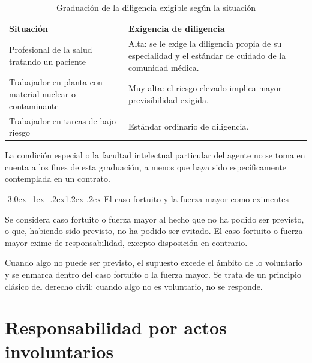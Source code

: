 \documentclass[12pt,oneside]{book}
\makeatletter
\renewcommand\section{\@startsection{section}{1}{\z@}%
  {-3.0ex \@plus -1ex \@minus -.2ex}{1.2ex \@plus .2ex}%
  {\normalfont\large\bfseries\color{acento}}}
\makeatother
\begin{document}
\begin{table}[H]
\centering
\caption{Graduación de la diligencia exigible según la situación}
\begin{tabularx}{\textwidth}{X X}
\toprule
\textbf{Situación} & \textbf{Exigencia de diligencia} \\
\midrule
Profesional de la salud tratando un paciente & Alta: se le exige la diligencia propia de su especialidad y el estándar de cuidado de la comunidad médica. \\
Trabajador en planta con material nuclear o contaminante & Muy alta: el riesgo elevado implica mayor previsibilidad exigida. \\
Trabajador en tareas de bajo riesgo & Estándar ordinario de diligencia. \\
\bottomrule
\end{tabularx}
\end{table}

La condición especial o la facultad intelectual particular del agente no se toma en cuenta a los fines de esta graduación, a menos que haya sido específicamente contemplada en un contrato.

\section{El caso fortuito y la fuerza mayor como eximentes}

\begin{definicion}
Se considera caso fortuito o fuerza mayor al hecho que no ha podido ser previsto, o que, habiendo sido previsto, no ha podido ser evitado. El caso fortuito o fuerza mayor exime de responsabilidad, excepto disposición en contrario.
\end{definicion}

\begin{importante}
Cuando algo no puede ser previsto, el supuesto excede el ámbito de lo voluntario y se enmarca dentro del caso fortuito o la fuerza mayor. Se trata de un principio clásico del derecho civil: cuando algo no es voluntario, no se responde.
\end{importante}


\chapter{Responsabilidad por actos involuntarios}
\end{document}

